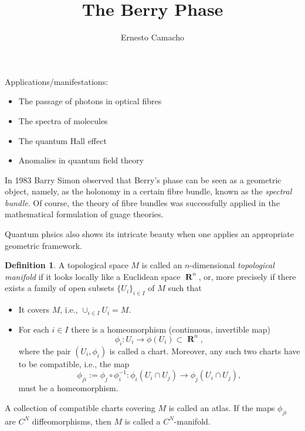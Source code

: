 \documentclass[a4paper]{article}
\title{The Berry Phase}
\author{Ernesto Camacho}
\DeclareMathOperator{\R}{\mathbf{R}}
\theoremstyle{definition}
\newtheorem{defn}{Definition}
\theoremstyle{plain}
\begin{document}
    \maketitle

    Applications/manifestations:
    \begin{itemize}
        \item The passage of photons in optical fibres
        \item The spectra of molecules
        \item The quantum Hall effect
        \item Anomalies in quantum field theory
    \end{itemize}

    In 1983 Barry Simon observed that Berry's phase can be
    seen as a geometric object, namely, as the holonomy in a
    certain fibre bundle, known as the \textit{spectral
    bundle}. Of course, the theory of fibre bundles was
    successfully applied in the mathematical formulation of
    guage theories.

    Quantum phsics also shows its intricate beauty when one
    applies an appropriate geometric framework.

    \begin{defn}
        A topological space $M$ is called an $n$-dimensional
        \textit{topological manifold} if it looks locally
        like a Euclidean space $\R^{n}$, or, more precisely
        if there exists a family of open subsets $\{U_i\}_{i
        \in I}$ of $M$ such that
        \begin{itemize}
            \item It covers $M$, i.e., $\cup_{i \in I} U_i =
                M$. 
            \item For each $i \in I$ there is a
                homeomorphism (continuous, invertible map)
                \begin{equation}
                    \phi_i
                    : U_i \to \phi(U_i) \subset \R^{n},
                \end{equation}
                where the pair $(U_i,\phi_i)$ is called a
                chart. Moreover, any such two charts have to
                be compatible, i.e., the map
                \begin{equation}
                    \phi_{ji}
                    := \phi_j \circ \phi_i^{-1}
                    : \phi_i(U_i \cap U_j)
                    \to \phi_j(U_i \cap U_j),
                \end{equation}
                must be a homeomorphism.
        \end{itemize}
        A collection of compatible charts covering $M$ is
        called an atlas. If the maps $\phi_{ji}$ are $C^{N}$ 
        diffeomorphisms, then $M$ is called a
        $C^{N}$-manifold.
    \end{defn}
\end{document}
